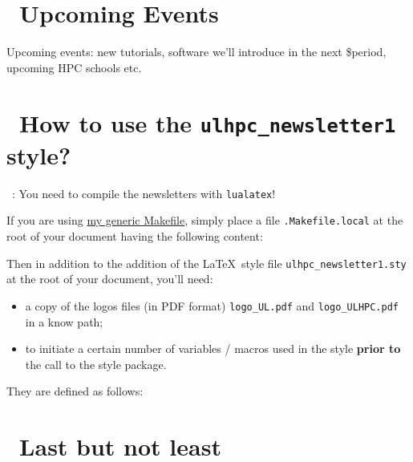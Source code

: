 \documentclass[a4paper]{article}
\begin{document}
\section{\faCalendar\ Upcoming Events}
Upcoming events: new tutorials, software we'll introduce in the next
\$period, upcoming HPC schools etc.

\newpage
\section{\faCogs\ How to use the \texttt{ulhpc\_newsletter1} style?}

\faWarningSign\ : You need to compile the newsletters with \texttt{lualatex}! 

If you are using \href{https://github.com/Falkor/Makefiles/blob/devel/latex/Makefile}{my generic Makefile}, simply place a file \texttt{.Makefile.local} at the root of your document having the following content:



Then in addition to the addition of the \LaTeX\ style file \texttt{ulhpc\_newsletter1.sty} at the root of your document, you'll need: 

\begin{itemize}
  \item a copy of the logos files (in PDF format) \texttt{logo\_UL.pdf} and \texttt{logo\_ULHPC.pdf} in a know path;
  \item to initiate a certain number of variables / macros used in the style \textbf{prior to} the call to the style package.
\end{itemize}

They are defined as follows: 






\section{\faBeer\ Last but not least}

\lipsum[2-8]
\end{document}
